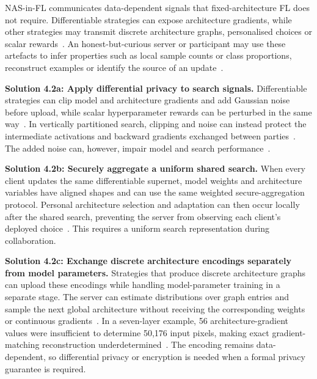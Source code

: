 NAS-in-FL communicates data-dependent signals that fixed-architecture FL does not require. Differentiable strategies can expose architecture gradients, while other strategies may transmit discrete architecture graphs, personalised choices or scalar rewards~\cite{dp-fnas_2020,multi-granular_fednas_2023,privacy_preserving_fednas_for_edge_2025,feathers_2023}. An honest-but-curious server or participant may use these artefacts to infer properties such as local sample counts or class proportions, reconstruct examples or identify the source of an update~\cite{multi-granular_fednas_2023,privacy_preserving_fednas_for_edge_2025}.

\noindent\textbf{Solution 4.2a: Apply differential privacy to search signals.} Differentiable strategies can clip model and architecture gradients and add Gaussian noise before upload, while scalar hyperparameter rewards can be perturbed in the same way~\cite{dp-fnas_2020,feathers_2023}. In vertically partitioned search, clipping and noise can instead protect the intermediate activations and backward gradients exchanged between parties~\cite{self-supervised_vertical_fednas_2023}. The added noise can, however, impair model and search performance~\cite{privacy_preserving_fednas_for_edge_2025}.

\noindent\textbf{Solution 4.2b: Securely aggregate a uniform shared search.} When every client updates the same differentiable supernet, model weights and architecture variables have aligned shapes and can use the same weighted secure-aggregation protocol. Personal architecture selection and adaptation can then occur locally after the shared search, preventing the server from observing each client's deployed choice~\cite{privacy_preserving_fednas_for_edge_2025}. This requires a uniform search representation during collaboration.

\noindent\textbf{Solution 4.2c: Exchange discrete architecture encodings separately from model parameters.} Strategies that produce discrete architecture graphs can upload these encodings while handling model-parameter training in a separate stage. The server can estimate distributions over graph entries and sample the next global architecture without receiving the corresponding weights or continuous gradients~\cite{multi-granular_fednas_2023}. In a seven-layer example, 56 architecture-gradient values were insufficient to determine 50,176 input pixels, making exact gradient-matching reconstruction underdetermined~\cite{multi-granular_fednas_2023}. The encoding remains data-dependent, so differential privacy or encryption is needed when a formal privacy guarantee is required.
